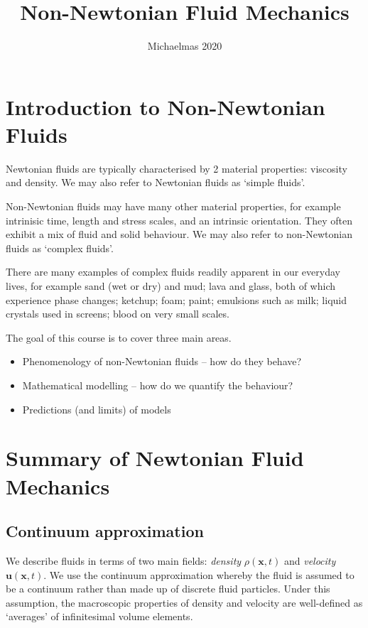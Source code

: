 \documentclass{jknotes}
\begin{document}
\title{Non-Newtonian Fluid Mechanics}
\date{Michaelmas 2020}

\maketitle
\suggestionsspiel
\tableofcontents

\section{Introduction to Non-Newtonian Fluids}
Newtonian fluids are typically characterised by 2 material properties:
viscosity and density. We may also refer to Newtonian fluids as `simple
fluids'.


Non-Newtonian fluids may have many other material properties, for example
intrinisic time, length and stress scales, and an intrinsic orientation. They
often exhibit a mix of fluid and solid behaviour. We may also refer to
non-Newtonian fluids as `complex fluids'.


There are many examples of complex fluids readily apparent in our everyday
lives, for example sand (wet or dry) and mud; lava and glass, both of which
experience phase changes; ketchup; foam; paint; emulsions such as milk; liquid
crystals used in screens; blood on very small scales.


The goal of this course is to cover three main areas.
\begin{itemize}
	\item Phenomenology of non-Newtonian fluids -- how do they behave?
	\item Mathematical modelling -- how do we quantify the behaviour?
	\item Predictions (and limits) of models
\end{itemize}

\section{Summary of Newtonian Fluid Mechanics}
\subsection{Continuum approximation}
We describe fluids in terms of two main fields: \emph{density} $\rho(\symbf{x},t)$  and
\emph{velocity} $\symbf{u}(\symbf{x},t)$. We use the continuum approximation whereby the
fluid is assumed to be a continuum rather than made up of discrete fluid
particles. Under this assumption, the macroscopic properties of density and
velocity are well-defined as `averages' of infinitesimal volume elements. 
\end{document}
